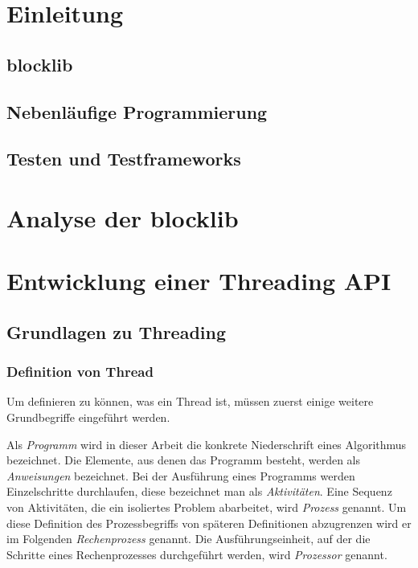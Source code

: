 \documentclass[12pt,a4paper,listof=totocnumbered,parskip=half]{scrreprt}
\begin{document}

\null\thispagestyle{empty}\clearpage
\tableofcontents
\chapter{Einleitung}
\section{blocklib}
\section{Nebenläufige Programmierung}
\section{Testen und Testframeworks}

\chapter{Analyse der blocklib}


\chapter{Entwicklung einer Threading API}

\section{Grundlagen zu Threading}
\subsection{Definition von Thread}
Um definieren zu können, was ein Thread ist, müssen zuerst einige weitere Grundbegriffe eingeführt werden. 

Als \emph{Programm} wird in dieser Arbeit die konkrete Niederschrift eines Algorithmus bezeichnet. Die Elemente, aus denen das Programm besteht, werden als \emph{Anweisungen} bezeichnet. Bei der Ausführung eines Programms werden Einzelschritte durchlaufen, diese bezeichnet man als \emph{Aktivitäten}. Eine Sequenz von Aktivitäten, die ein isoliertes Problem abarbeitet, wird \emph{Prozess} genannt. Um diese Definition des Prozessbegriffs von späteren Definitionen abzugrenzen wird er im Folgenden \emph{Rechenprozess} genannt. Die Ausführungseinheit, auf der die Schritte eines Rechenprozesses durchgeführt werden, wird \emph{Prozessor} genannt.\cite{Herrtwich1989}
\end{document}
